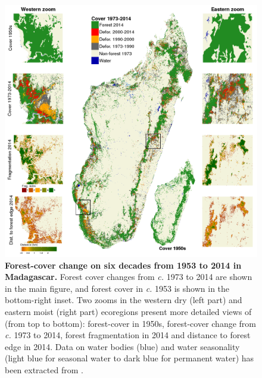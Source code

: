 \documentclass[a4paper, 12pt, leqno]{article} %
\begin{document}
\newpage

\begin{figure}[h!]
  \centering
  
  \includegraphics[width=\textwidth]{fig_fcc_highres.png}
  
  \caption{\textbf{Forest-cover change on six decades from 1953
      to 2014 in Madagascar.} Forest cover changes from \emph{c.} 1973 to 2014
    are shown in the main figure, and forest cover in \emph{c.} 1953 is
    shown in the bottom-right inset. Two zooms in the western dry (left
    part) and eastern moist (right part) ecoregions present more detailed
    views of (from top to bottom): forest-cover in 1950s, forest-cover
    change from \emph{c.} 1973 to 2014, forest fragmentation in 2014 and
    distance to forest edge in 2014. Data on water bodies (blue) and water
    seasonality (light blue for seasonal water to dark blue for permanent
    water) has been extracted from \citet{Pekel2016}.}

  \label{fig:fcc}

\end{figure}

\newpage
\end{document}
